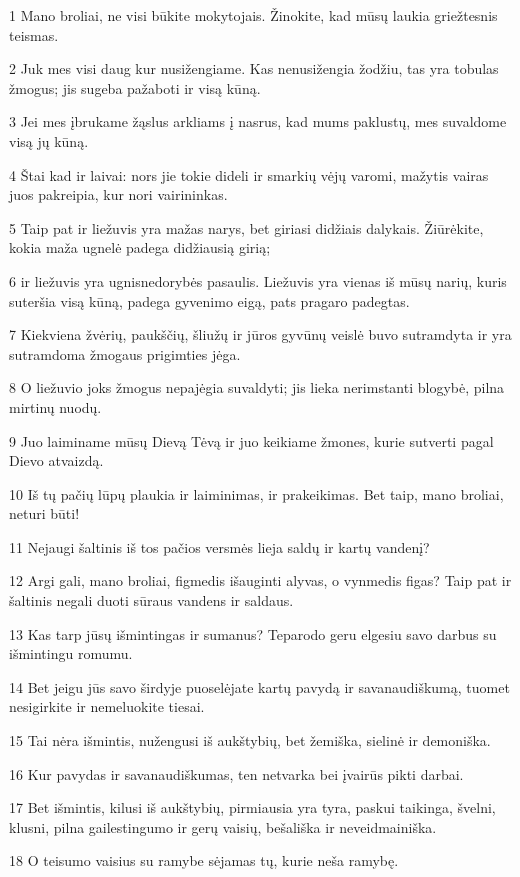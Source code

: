 \par 1 Mano broliai, ne visi būkite mokytojais. Žinokite, kad mūsų laukia griežtesnis teismas. 
\par 2 Juk mes visi daug kur nusižengiame. Kas nenusižengia žodžiu, tas yra tobulas žmogus; jis sugeba pažaboti ir visą kūną. 
\par 3 Jei mes įbrukame žąslus arkliams į nasrus, kad mums paklustų, mes suvaldome visą jų kūną. 
\par 4 Štai kad ir laivai: nors jie tokie dideli ir smarkių vėjų varomi, mažytis vairas juos pakreipia, kur nori vairininkas. 
\par 5 Taip pat ir liežuvis yra mažas narys, bet giriasi didžiais dalykais. Žiūrėkite, kokia maža ugnelė padega didžiausią girią; 
\par 6 ir liežuvis yra ugnis­nedorybės pasaulis. Liežuvis yra vienas iš mūsų narių, kuris suteršia visą kūną, padega gyvenimo eigą, pats pragaro padegtas. 
\par 7 Kiekviena žvėrių, paukščių, šliužų ir jūros gyvūnų veislė buvo sutramdyta ir yra sutramdoma žmogaus prigimties jėga. 
\par 8 O liežuvio joks žmogus nepajėgia suvaldyti; jis lieka nerimstanti blogybė, pilna mirtinų nuodų. 
\par 9 Juo laiminame mūsų Dievą Tėvą ir juo keikiame žmones, kurie sutverti pagal Dievo atvaizdą. 
\par 10 Iš tų pačių lūpų plaukia ir laiminimas, ir prakeikimas. Bet taip, mano broliai, neturi būti! 
\par 11 Nejaugi šaltinis iš tos pačios versmės lieja saldų ir kartų vandenį? 
\par 12 Argi gali, mano broliai, figmedis išauginti alyvas, o vynmedis figas? Taip pat ir šaltinis negali duoti sūraus vandens ir saldaus. 
\par 13 Kas tarp jūsų išmintingas ir sumanus? Teparodo geru elgesiu savo darbus su išmintingu romumu. 
\par 14 Bet jeigu jūs savo širdyje puoselėjate kartų pavydą ir savanaudiškumą, tuomet nesigirkite ir nemeluokite tiesai. 
\par 15 Tai nėra išmintis, nužengusi iš aukštybių, bet žemiška, sielinė ir demoniška. 
\par 16 Kur pavydas ir savanaudiškumas, ten netvarka bei įvairūs pikti darbai. 
\par 17 Bet išmintis, kilusi iš aukštybių, pirmiausia yra tyra, paskui taikinga, švelni, klusni, pilna gailestingumo ir gerų vaisių, bešališka ir neveidmainiška. 
\par 18 O teisumo vaisius su ramybe sėjamas tų, kurie neša ramybę.


